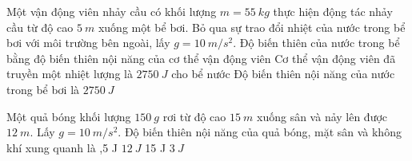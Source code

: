 \begin{ex} 
Một vận động viên nhảy cầu có khối lượng $m=55 \ kg$ thực hiện động tác nhảy cầu từ độ cao $5 \ m$ xuống một bể bơi. Bỏ qua sự trao đổi nhiệt của nước trong bể bơi với môi trường bên ngoài, lấy $g=10 \ m/s^2$.
{Độ biến thiên của nước trong bể bằng độ biến thiên nội năng của cơ thể vận động viên}
{Cơ thể vận động viên đã truyền một nhiệt lượng là $2750 \ J$ cho bể nước}
{\True Độ biến thiên nội năng của nước trong bể bơi là $2750 \ J$}
\end{ex}

\begin{ex} 
Một quả bóng khối lượng $150 \ g$ rơi từ độ cao $15 \ m$ xuống sân và nảy lên được $12 \ m$. Lấy $g=10 \ m/s^2$. Độ biến thiên nội năng của quả bóng, mặt sân và không khí xung quanh là
\choice
{,5 J}
{$12 \ J$}
{15 J}
{$3 \ J$}
\end{ex}



